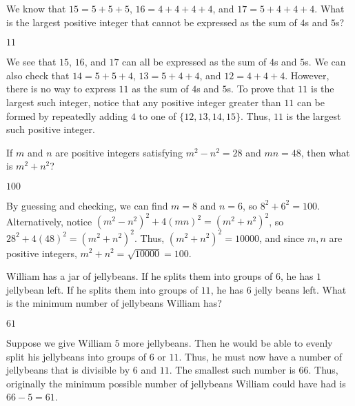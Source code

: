 \documentclass{article}
\begin{document}

\begin{problem}
We know that $15 = 5 + 5 + 5$, $16 = 4 + 4 + 4 + 4$, and $17 = 5 + 4 + 4 + 4$. What is the largest positive integer that cannot be expressed as the sum of $4$s and $5$s? 
\end{problem}
\begin{answer}
$11$
\end{answer}
\begin{solution}
We see that $15$, $16$, and $17$ can all be expressed as the sum of $4$s and $5$s. We can also check that $14 = 5 + 5 + 4$, $13 = 5 + 4 + 4$, and $12 = 4 + 4 + 4$. However, there is no way to express $11$ as the sum of $4$s and $5$s. To prove that $11$ is the largest such integer, notice that any positive integer greater than $11$ can be formed by repeatedly adding $4$ to one of $\{12, 13, 14, 15\}$. Thus, $\boxed{11}$ is the largest such positive integer.
\end{solution}


\begin{problem}
If $m$ and $n$ are positive integers satisfying $m^2-n^2 = 28$ and $mn=48$, then what is $m^2+n^2$?
\end{problem}
\begin{answer}
$100$
\end{answer}
\begin{solution}
By guessing and checking, we can find $m=8$ and $n=6$, so $8^2 + 6^2 = 100$. Alternatively, notice $(m^2 - n^2)^2 + 4(mn)^2 = (m^2 + n^2)^2 $, so $28^2 + 4(48)^2 = (m^2+n^2)^2$. Thus, $(m^2+n^2)^2 = 10000$, and since $m,n$ are positive integers, $m^2+n^2 = \sqrt{10000} = \boxed{100}$.
\end{solution}
\begin{problem}
William has a jar of jellybeans. If he splits them into groups of $6$, he has $1$ jellybean left. If he splits them into groups of $11$, he has $6$ jelly beans left. What is the minimum number of jellybeans William has?
\end{problem}
\begin{answer}
$61$
\end{answer}
\begin{solution}
Suppose we give William $5$ more jellybeans. Then he would be able to evenly split his jellybeans into groups of $6$ or $11$. Thus, he must now have a number of jellybeans that is divisible by $6$ and $11$. The smallest such number is $66$. Thus, originally the minimum possible number of jellybeans William could have had is $66 - 5 = \boxed{61}$.
\end{solution}
\end{document}
